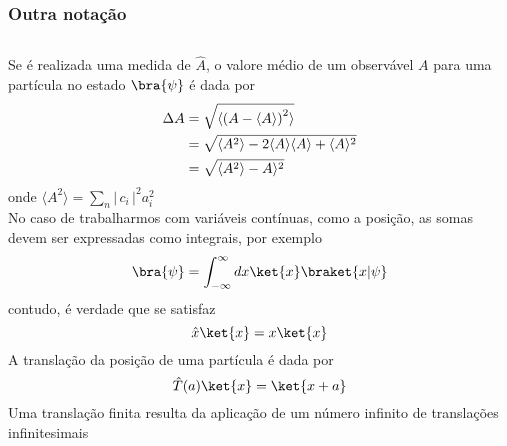 \documentclass[12pt,brazil,table]{beamer}
\begin{document}
\begin{frame}
  \frametitle{Outra notação}
  \fontsize{7pt}{11pt}\selectfont
  
  \begin{columns}[T]
  
  Se é realizada uma medida de $\hat{A}$, o valore médio de um observável $A$ para uma partícula no estado $\bra{\psi}$ é dada por\vspace*{-0.5cm}
  \[
    \begin{align*}
      \Delta A &= \sqrt{\langle \left( A-  \langle A\rangle\right)^2 \rangle}\\
      &=\sqrt{\langle A^2 \rangle - 2\langle A\rangle\langle A\rangle + \langle A\rangle ^2}\\
      &= \sqrt{\langle A^2 \rangle - A\rangle ^2}
    \end{align*}\vspace*{-0.25cm}
  \]
  onde $\langle A^2 \rangle = \sum_n \left|\, c_i  \,\right|^2 a_i^2$\\
  
  No caso de trabalharmos com variáveis contínuas, como a posição, as somas devem ser expressadas como integrais, por exemplo\vspace*{-0.25cm}
  \[
   \bra{\psi} = \int_{-\infty}^\infty dx \ket{x}\braket{x|\psi}\vspace*{-0.25cm}
  \]
  contudo, é verdade que se satisfaz\vspace*{-0.25cm}
  \[
    \hat{x}\ket{x}=x\ket{x}\vspace*{-0.35cm}
  \]
  A translação da posição de uma partícula é dada por\vspace*{-0.35cm}
  \[
   \hat{T}(a)\ket{x}=\ket{x+a}\vspace*{-0.25cm}
  \]
  Uma translação finita resulta da aplicação de um número infinito de translações infinitesimais
  

\end{columns}
\end{frame}
\end{document}
